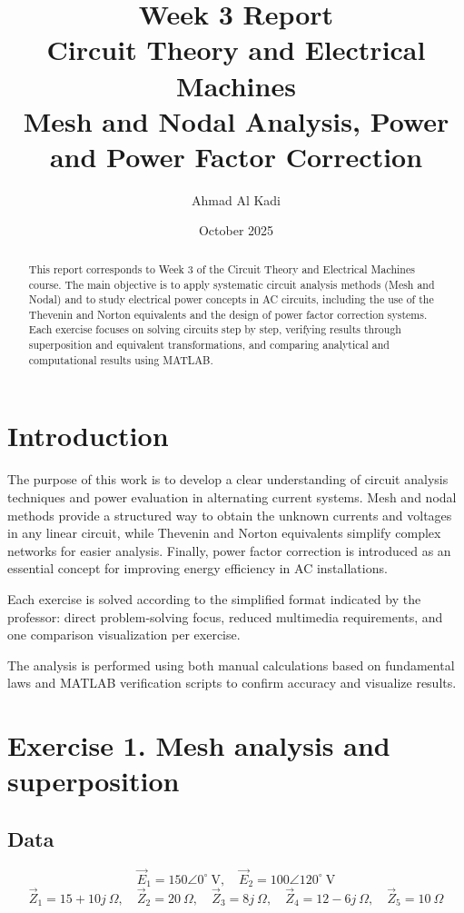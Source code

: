 \documentclass[a4paper,12pt]{article}
\title{\textbf{Week 3 Report}\\Circuit Theory and Electrical Machines\\\large Mesh and Nodal Analysis, Power and Power Factor Correction}
\author{Ahmad Al Kadi}
\date{October 2025}
\begin{document}
\maketitle

\begin{abstract}
This report corresponds to Week 3 of the Circuit Theory and Electrical Machines course. 
The main objective is to apply systematic circuit analysis methods (Mesh and Nodal) 
and to study electrical power concepts in AC circuits, including the use of the Thevenin and Norton equivalents 
and the design of power factor correction systems. 
Each exercise focuses on solving circuits step by step, verifying results through superposition and equivalent transformations, 
and comparing analytical and computational results using MATLAB.
\end{abstract}

\section{Introduction}
The purpose of this work is to develop a clear understanding of circuit analysis techniques and power evaluation in alternating current systems. 
Mesh and nodal methods provide a structured way to obtain the unknown currents and voltages in any linear circuit, 
while Thevenin and Norton equivalents simplify complex networks for easier analysis. 
Finally, power factor correction is introduced as an essential concept for improving energy efficiency in AC installations. 

Each exercise is solved according to the simplified format indicated by the professor: 
direct problem-solving focus, reduced multimedia requirements, and one comparison visualization per exercise. 

\bigskip
The analysis is performed using both manual calculations based on fundamental laws 
and MATLAB verification scripts to confirm accuracy and visualize results.



\section{Exercise 1. Mesh analysis and superposition}

\subsection*{Data}
\[
\vec E_1=150\angle 0^\circ~\text{V},\quad
\vec E_2=100\angle 120^\circ~\text{V}
\]
\[
\vec Z_1=15+10j~\Omega,\quad
\vec Z_2=20~\Omega,\quad
\vec Z_3=8j~\Omega,\quad
\vec Z_4=12-6j~\Omega,\quad
\vec Z_5=10~\Omega
\]
\end{document}
